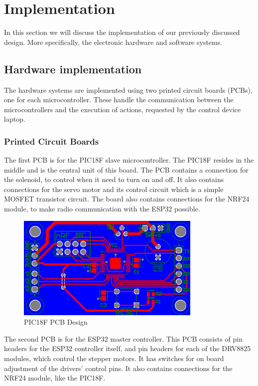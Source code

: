 \chapter{Implementation}
In this section we will discuss the implementation of our previously discussed design. More specifically, the electronic hardware and software systems.

\section{Hardware implementation}
The hardware systems are implemented using two printed circuit boards (PCBs), one for each microcontroller. These handle the communication between the microcontrollers and the execution of actions, requested by the control device laptop.

\subsection{Printed Circuit Boards}

The first PCB is for the PIC18F slave microcontroller. The PIC18F resides in the middle and is the central unit of this board. The PCB contains a connection for the solenoid, to control when it need to turn on and off. It also contains connections for the servo motor and its control circuit which is a simple MOSFET transistor circuit. The board also contains connections for the NRF24 module, to make radio communication with the ESP32 possible.

\begin{figure}[h]
	\centering\includegraphics[height=5cm]{./images/PIC18F_pcb}
	\caption{PIC18F PCB Design}
\end{figure}

The second PCB is for the ESP32 master controller. This PCB consists of pin headers for the ESP32 controller itself, and pin headers for each of the DRV8825 modules, which control the stepper motors. It has switches for on board adjustment of the drivers' control pins. It also contains connections for the NRF24 module, like the PIC18F.

